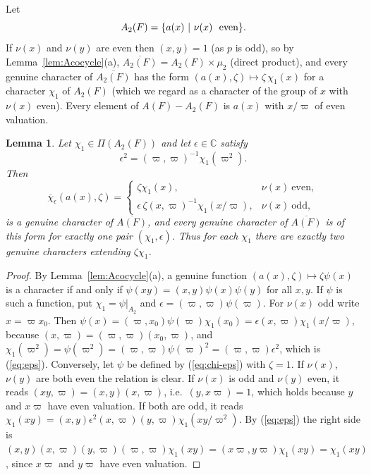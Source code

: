 \documentclass[12pt,letterpaper,openany]{book}
\theoremstyle{plain}
\newtheorem{lemma}[theorem]{Lemma}
\theoremstyle{definition}
\theoremstyle{remark}
\theoremstyle{remark}
\begin{document}
Let
\[
A_2(F)=\{a(x)\ |\ \nu (x)\ {\rm \ even}\}.
\]
If $\nu(x)$ and $\nu(y)$ are even then $(x,y)=1$ (as $p$ is odd), so by
Lemma~\ref{lem:Acocycle}(a), $\overline{A_2(F)}=A_2(F)\times \mu_2$
(direct product), and every genuine character of $\overline{A_2(F)}$
has the form $(a(x),\zeta)\mapsto\zeta\,\chi_1(x)$ for a character
$\chi_1$ of $A_2(F)$ (which we regard as a character of the group of
$x$ with $\nu(x)$ even). Every element of $A(F)-A_2(F)$ is $a(x)$ with
$x/\varpi$ of even valuation.

\begin{lemma}\label{lem:genuine-chars}
Let $\chi_1\in\Pi(A_2(F))$ and let $\epsilon\in{\mathbb C}$ satisfy
\begin{equation}\label{eq:eps}
\epsilon^2=(\varpi,\varpi)^{-1}\chi_1(\varpi^2).
\end{equation}
Then
\begin{equation}\label{eq:chi-eps}
\overline{\chi}_\epsilon (a(x),\zeta)=
\left\{
\begin{array}{ll}
\zeta\chi_1(x), & \nu(x)\ \text{even},\\
\epsilon\,\zeta(x,\varpi)^{-1}\chi_1(x/\varpi),
& \nu(x)\ \text{odd},
\end{array}
\right.
\end{equation}
is a genuine character of $\overline{A(F)}$, and every genuine character
of $\overline{A(F)}$ is of this form for exactly one pair
$(\chi_1,\epsilon)$. Thus for each $\chi_1$ there are exactly two genuine
characters extending $\zeta\chi_1$.
\end{lemma}

\begin{proof}
By Lemma~\ref{lem:Acocycle}(a), a genuine function
$(a(x),\zeta)\mapsto\zeta\psi(x)$ is a character if and only if
$\psi(xy)=(x,y)\psi(x)\psi(y)$ for all $x,y$. If $\psi$ is such a
function, put $\chi_1=\psi|_{A_2}$ and
$\epsilon=(\varpi,\varpi)\psi(\varpi)$. For $\nu(x)$ odd write
$x=\varpi x_0$. Then
$\psi(x)=(\varpi,x_0)\psi(\varpi)\chi_1(x_0)=\epsilon(x,\varpi)\chi_1(x/\varpi)$,
because $(x,\varpi)=(\varpi,\varpi)(x_0,\varpi)$, and
$\chi_1(\varpi^2)=\psi(\varpi^2)=(\varpi,\varpi)\psi(\varpi)^2
=(\varpi,\varpi)\epsilon^2$, which is (\ref{eq:eps}). Conversely, let
$\psi$ be defined by (\ref{eq:chi-eps}) with $\zeta=1$. If $\nu(x)$,
$\nu(y)$ are both even the relation is clear. If $\nu(x)$ is odd and
$\nu(y)$ even, it reads $(xy,\varpi)=(x,y)(x,\varpi)$, i.e.\
$(y,x\varpi)=1$, which holds because $y$ and $x\varpi$ have even
valuation. If both are odd, it reads
$\chi_1(xy)=(x,y)\epsilon^2(x,\varpi)(y,\varpi)\chi_1(xy/\varpi^2)$. By
(\ref{eq:eps}) the right side is
$(x,y)(x,\varpi)(y,\varpi)(\varpi,\varpi)\chi_1(xy)
=(x\varpi,y\varpi)\chi_1(xy)=\chi_1(xy)$, since $x\varpi$ and $y\varpi$
have even valuation.
\end{proof}
\end{document}
